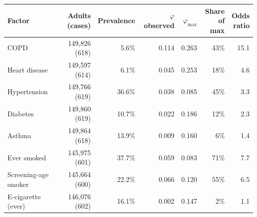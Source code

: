 \begin{tabular}{lrrrrrr}
\toprule
Factor & Adults (cases) & Prevalence & \makecell[b]{$\varphi$\\{}observed} & $\varphi_{\max}$ & \makecell[b]{Share\\{}of max} & \makecell[b]{Odds\\{}ratio} \\
\midrule
COPD & 149,826 (618) & 5.6\% & 0.114 & 0.263 & 43\% & 15.1 \\
Heart disease & 149,597 (614) & 6.1\% & 0.045 & 0.253 & 18\% & 4.6 \\
Hypertension & 149,766 (619) & 36.6\% & 0.038 & 0.085 & 45\% & 3.3 \\
Diabetes & 149,860 (619) & 10.7\% & 0.022 & 0.186 & 12\% & 2.3 \\
Asthma & 149,864 (618) & 13.9\% & 0.009 & 0.160 & 6\% & 1.4 \\
Ever smoked & 145,975 (601) & 37.7\% & 0.059 & 0.083 & 71\% & 7.7 \\
Screening-age smoker & 145,664 (600) & 22.2\% & 0.066 & 0.120 & 55\% & 6.5 \\
E-cigarette (ever) & 146,076 (602) & 16.1\% & 0.002 & 0.147 & 2\% & 1.1 \\
\bottomrule
\end{tabular}

